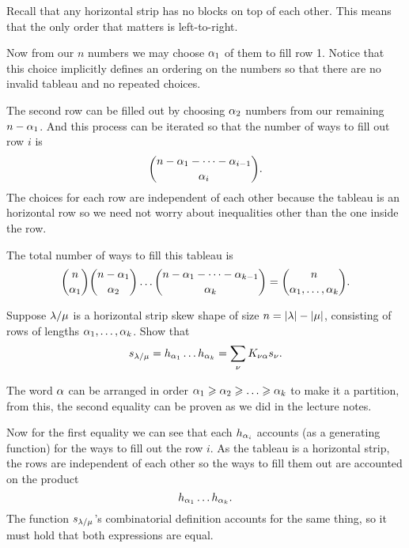 \documentclass[12pt]{memoir}
\begin{document}
\begin{ptcbr}
   Recall that any horizontal strip has no blocks on top of each other. This means that the only order that matters is left-to-right.\par
   Now from our $n$ numbers we may choose $\alpha_1$ of them to fill row 1. Notice that this choice implicitly defines an ordering on the numbers so that there are no invalid tableau and no repeated choices.\par 
   The second row can be filled out by choosing $\alpha_2$ numbers from our remaining $n-\alpha_1$. And this process can be iterated so that the number of ways to fill out row $i$ is 
   $$\binom{n-\alpha_1-\dots-\alpha_{i-1}}{\alpha_i}.$$
   The choices for each row are independent of each other because the tableau is an horizontal row so we need not worry about inequalities other than the one inside the row.\par 
   The total number of ways to fill this tableau is 
   $$\binom{n}{\alpha_1}\binom{n-\alpha_1}{\alpha_2}\dots\binom{n-\alpha_1-\dots-\alpha_{k-1}}{\alpha_k}=\binom{n}{\alpha_1,\dots,\alpha_k}.$$
\end{ptcbr}
\fi
\begin{Ej}[Exercise 4]
    Suppose $\lambda/\mu$ is a horizontal strip skew shape of size $n =\abs{\lambda}-\abs{\mu}$, consisting of rows of
lengths $\alpha_1,\dots,\alpha_k$. Show that 
$$s_{\lambda/\mu}=h_{\alpha_1}\dots h_{\alpha_k}=\sum_{\nu}K_{\nu\alpha}s_\nu.$$
\end{Ej}

\begin{ptcbr}
    The word $\alpha$ can be arranged in order $\al_1\geq\al_2\geq\dots\geq\al_k$ to make it a partition, from this, the second equality can be proven as we did in the lecture notes.\par 
    Now for the first equality we can see that each $h_{\alpha_{i}}$ accounts (as a generating function) for the ways to fill out the row $i$. As the tableau is a horizontal strip, the rows are independent of each other so the ways to fill them out are accounted on the product 
    $$h_{\alpha_1}\dots h_{\alpha_k}.$$
    The function $s_{\lambda/\mu}$'s combinatorial definition accounts for the same thing, so it must hold that both expressions are equal.
\end{ptcbr}
\end{document}
